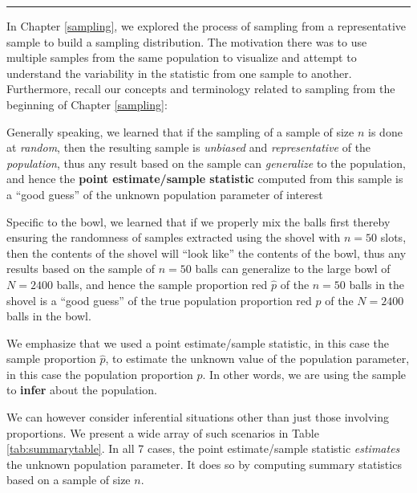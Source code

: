 \documentclass[12pt, krantz2,]{krantz}
\begin{document}
\begin{center}\rule{0.5\linewidth}{\linethickness}\end{center}

In Chapter \ref{sampling}, we explored the process of sampling from a representative sample to build a sampling distribution. The motivation there was to use multiple samples from the same population to visualize and attempt to understand the variability in the statistic from one sample to another. Furthermore, recall our concepts and terminology related to sampling from the beginning of Chapter \ref{sampling}:

Generally speaking, we learned that if the sampling of a sample of size \(n\) is done at \emph{random}, then the resulting sample is \emph{unbiased} and \emph{representative} of the \emph{population}, thus any result based on the sample can \emph{generalize} to the population, and hence the \textbf{point estimate/sample statistic} computed from this sample is a ``good guess'' of the unknown population parameter of interest

Specific to the bowl, we learned that if we properly mix the balls first thereby ensuring the randomness of samples extracted using the shovel with \(n=50\) slots, then the contents of the shovel will ``look like'' the contents of the bowl, thus any results based on the sample of \(n=50\) balls can generalize to the large bowl of \(N=2400\) balls, and hence the sample proportion red \(\widehat{p}\) of the \(n=50\) balls in the shovel is a ``good guess'' of the true population proportion red \(p\) of the \(N=2400\) balls in the bowl.

We emphasize that we used a point estimate/sample statistic, in this case the sample proportion \(\widehat{p}\), to estimate the unknown value of the population parameter, in this case the population proportion \(p\). In other words, we are using the sample to \textbf{infer} about the population.

We can however consider inferential situations other than just those involving proportions. We present a wide array of such scenarios in Table \ref{tab:summarytable}. In all 7 cases, the point estimate/sample statistic \emph{estimates} the unknown population parameter. It does so by computing summary statistics based on a sample of size \(n\).
\end{document}
